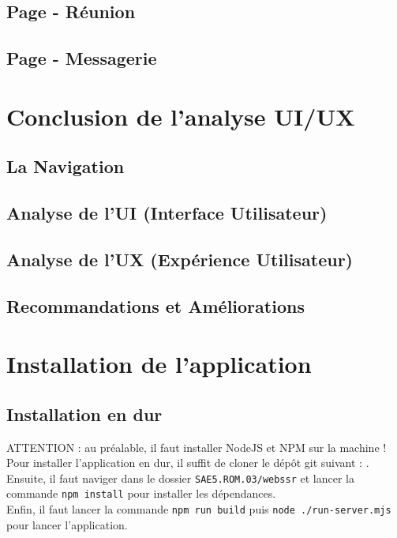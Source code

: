 \documentclass[12pt, a4paper, oneside]{Thesis}
\begin{document}
\subsection{Page - Réunion}

\subsection{Page - Messagerie}

\section{Conclusion de l'analyse UI/UX}

\subsection{La Navigation}
\subsection{Analyse de l'UI (Interface Utilisateur)}
\subsection{Analyse de l'UX (Expérience Utilisateur)}
\subsection{Recommandations et Améliorations}




\newpage

\section{Installation de l'application}

\subsection{Installation en dur}

ATTENTION : au préalable, il faut installer NodeJS et NPM sur la machine !\\

Pour installer l'application en dur, il suffit de cloner le dépôt git suivant : \url{}{}.\\

Ensuite, il faut naviger dans le dossier \verb|SAE5.ROM.03/webssr| et lancer la commande \verb|npm install| pour installer les dépendances.\\
Enfin, il faut lancer la commande \verb|npm run build| puis \verb|node ./run-server.mjs| pour lancer l'application.\\
\end{document}
